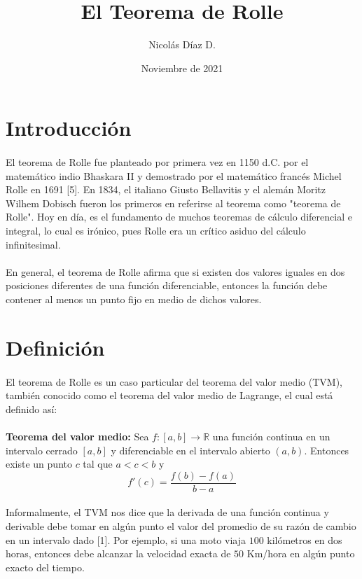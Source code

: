 \documentclass[letter]{article}
\title{El Teorema de Rolle}
\author{Nicolás Díaz D.}
\date{Noviembre de 2021}
\begin{document}
\maketitle
\section{Introducción}
\paragraph{}El teorema de Rolle fue planteado por primera vez en 1150 d.C. por el matemático indio Bhaskara II y demostrado por el matemático francés Michel Rolle en 1691 [5]. En 1834, el italiano Giusto Bellavitis y el alemán Moritz Wilhem Dobisch fueron los primeros en referirse al teorema como "teorema de Rolle". Hoy en día, es el fundamento de muchos teoremas de cálculo diferencial e integral, lo cual es irónico, pues Rolle era un crítico asiduo del cálculo infinitesimal.
\paragraph{}En general, el teorema de Rolle afirma que  si existen dos valores iguales en dos posiciones diferentes de una función diferenciable, entonces la función debe contener al menos un punto fijo en medio de dichos valores. 


\section{Definición}
\paragraph{}El teorema de Rolle es un caso particular del teorema del valor medio (TVM), también conocido como el teorema del valor medio de Lagrange, el cual está definido así:
\paragraph{}\textbf{Teorema del valor medio: }Sea $f:[a,b]\longrightarrow\mathbb{R}$ una función continua en un intervalo cerrado $[a,b]$ y diferenciable en el intervalo abierto $(a,b)$. Entonces existe un punto $c$ tal que $a<c<b$ y
$$f'(c)=\frac{f(b)-f(a)}{b-a}$$
\paragraph{}Informalmente, el TVM nos dice que la derivada de una función continua y derivable debe tomar en algún punto el valor del promedio de su razón de cambio en un intervalo dado [1]. Por ejemplo, si una moto viaja $100$ kilómetros en dos horas, entonces debe alcanzar la velocidad exacta de $50$ Km/hora en algún punto exacto del tiempo.
\end{document}
